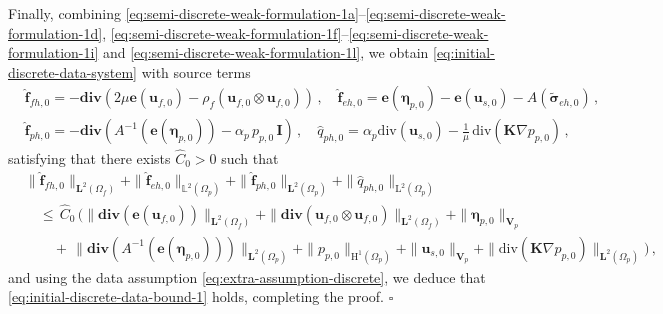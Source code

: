 \documentclass[11pt]{article}
\numberwithin{equation}{section}
\newcommand{\ds}{\displaystyle}
\newcommand{\bbeta}{{\boldsymbol\eta}}
\newcommand{\bsi}{{\boldsymbol\sigma}}
\newcommand{\bSigma}{{\boldsymbol\Sigma}}
\newcommand{\f}{\mathbf{f}}
\newcommand{\bu}{\mathbf{u}}
\newcommand{\be}{{\mathbf{e}}}
\newcommand{\0}{{\mathbf{0}}}
\def\bK{\mathbf{K}}
\def\bI{\mathbf{I}}
\def\bV{\mathbf{V}}
\newcommand{\bL}{\mathbf{L}}
\newcommand\bH{\mathbf{H}}
\newcommand\bbL{\mathbb{L}}
\def\H{\mathrm{H}}
\def\L{\mathrm{L}}
\def\bdiv{\mathbf{div}}
\def\div{\mathrm{div}}
\def\wh{\widehat}
\newenvironment{proof}{\noindent{\it Proof.}}{\hfill$\square$}
\numberwithin{equation}{section}
\begin{document}
\begin{proof}
Finally, combining \eqref{eq:semi-discrete-weak-formulation-1a}--\eqref{eq:semi-discrete-weak-formulation-1d}, \eqref{eq:semi-discrete-weak-formulation-1f}--\eqref{eq:semi-discrete-weak-formulation-1i} and \eqref{eq:semi-discrete-weak-formulation-1l}, we obtain \eqref{eq:initial-discrete-data-system} with source terms
%
\begin{align*}
& \wh{\f}_{fh,0} = -\bdiv(2\mu\be(\bu_{f,0}) - \rho_f(\bu_{f,0}\otimes \bu_{f,0})) \,,\quad 
\wh{\f}_{eh,0} =\be(\bbeta_{p,0}) - \be(\bu_{s,0}) - A(\widetilde\bsi_{eh,0}) \,, \\ \nonumber
& \wh{\f}_{ph,0} = - \bdiv(A^{-1}(\be(\bbeta_{p,0})) - \alpha_p\,p_{p,0}\,\bI) \,,\quad 
\wh{q}_{ph,0} = \alpha_p \div (\bu_{s,0}) - \frac{1}{\mu}\,\div(\bK\nabla p_{p,0}) \,,
\end{align*}
%
satisfying that there exists $\wh{C}_0 > 0$ such that
\begin{align}
&\|\wh{\f}_{fh,0}\|_{\bL^2(\Omega_f)} 
+ \|\wh{\f}_{eh,0}\|_{\bbL^2(\Omega_p)} 
+ \|\wh{\f}_{ph,0}\|_{\bL^2(\Omega_p)} 
+ \|\wh{q}_{ph,0}\|_{\L^2(\Omega_p)} \nonumber \\
&\ds\quad \leq\,
\wh{C}_0\,\Big(\|\bdiv(\be(\bu_{f,0}))\|_{\bL^{2}(\Omega_f)} 
+ \|\bdiv(\bu_{f,0}\otimes\bu_{f,0})\|_{\bL^{2}(\Omega_f)} 
+ \|\bbeta_{p,0}\|_{\bV_p} \nonumber \\
&\qquad +\, \|\bdiv(A^{-1}(\be(\bbeta_{p,0})))\|_{\bL^2(\Omega_p)}
+ \|p_{p,0}\|_{\H^1(\Omega_p)} 
+ \|\bu_{s,0}\|_{\bV_p}
+ \|\div(\bK\nabla p_{p,0})\|_{\bL^2(\Omega_p)}\Big) \,, 
\label{eq: discrete initial data bound-1}
\end{align}
and using the data assumption \eqref{eq:extra-assumption-discrete}, we deduce that \eqref{eq:initial-discrete-data-bound-1} holds, completing the proof.
\end{proof}
\end{document}
